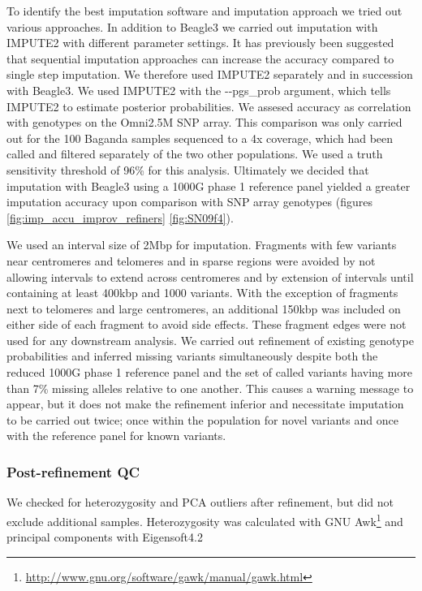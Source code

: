 To identify the best imputation software and imputation approach we tried out various approaches. In addition to Beagle3 we carried out imputation with IMPUTE2\cite{10.1371/journal.pgen.1000529} with different parameter settings. It has previously been suggested that sequential imputation approaches can increase the accuracy compared to single step imputation.\cite{Pasaniuc2012}
We therefore used IMPUTE2 separately and in succession with Beagle3. We used IMPUTE2 with the -{}-pgs\_prob argument, which tells IMPUTE2 to estimate posterior probabilities. We assesed accuracy as correlation with genotypes on the Omni2.5M SNP array. This comparison was only carried out for the 100 Baganda samples sequenced to a 4x coverage, which had been called and filtered separately of the two other populations. We used a truth sensitivity threshold of 96\% for this analysis.
Ultimately we decided that imputation with Beagle3\cite{Browning20071084} using a \gls{1000G} phase 1 reference panel yielded a greater imputation accuracy upon comparison with SNP array genotypes (figures \ref{fig:imp_accu_improv_refiners} \ref{fig:SN09f4}).



We used an interval size of 2\gls{Mbp} for imputation. Fragments with few variants near centromeres and telomeres and in sparse regions were avoided by not allowing intervals to extend across centromeres and by extension of intervals until containing at least 400\gls{kbp} and 1000 variants. With the exception of fragments next to telomeres and large centromeres, an additional 150\gls{kbp} was included on either side of each fragment to avoid side effects. These fragment edges were not used for any downstream analysis.
We carried out refinement of existing genotype probabilities and inferred missing variants simultaneously despite both the reduced \gls{1000G} phase 1 reference panel and the set of called variants having more than 7\% missing alleles relative to one another. This causes a warning message to appear, but it does not make the refinement inferior and necessitate imputation to be carried out twice; once within the population for novel variants and once with the reference panel for known variants.

\subsubsection{Post-refinement \gls{QC}}
We checked for heterozygosity and \gls{PCA} outliers after refinement, but did not exclude additional samples. Heterozygosity was calculated with GNU Awk\footnote{\url{http://www.gnu.org/software/gawk/manual/gawk.html}} and principal components with Eigensoft4.2\cite{10.1371/journal.pgen.0020190}\cite{Price2006}


